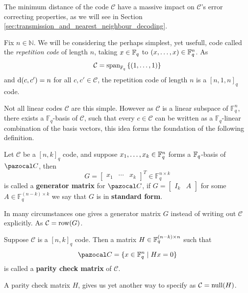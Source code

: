 The minimum distance of the code $\mathcal{C}$ have a massive impact on $\mathcal{C}$'s error correcting properties, as we will see in Section \ref{sec:transmission_and_nearest_neighbour_decoding}.

\begin{example}\label{exmp:repetition_code}
  Fix $n \in \mathbb{N}$.
  We will be considering the perhaps simplest, yet usefull, code called the \textit{repetition code} of length $n$, taking $x \in \mathbb{F}_{q}$ to $(x, \ldots, x) \in \mathbb{F}_{q}^{n}$.
  As
  \begin{equation*}
    \mathcal{C} = \textnormal{span}_{\mathbb{F}_{q}}\left\{(1, \ldots, 1)\right\}
  \end{equation*}
  and $\mathrm{d}(c, c') = n$ for all $c, c' \in \mathcal{C}$, the repetition code of length $n$ is a $[n, 1, n]_{q}$ code.
\end{example}
Not all linear codes $\mathcal{C}$ are this simple. However as $\mathcal{C}$ is a linear subspace of $\mathbb{F}_q^{n}$, there exists a $\mathbb{F}_q$-basis of $\mathcal{C}$, such that every $c \in \mathcal{C}$ can be written as a $\mathbb{F}_q$-linear combination of the basis vectors, this idea forms the foundation of the following definition.

\begin{definition}
  Let $\mathcal{C}$ be a $[n, k]_{q}$ code, and suppose $x_{1}, \ldots, x_{k} \in \mathbb{F}_{q}^{n}$ forms a $\mathbb{F}_{q}$-basis of $\C$, then
  \begin{equation*}
    G = \begin{bmatrix} x_{1} & \cdots & x_{k} \end{bmatrix}^{T} \in \mathbb{F}^{n \times k}_{q}
  \end{equation*}
  is called a \textbf{generator matrix} for $\C$, if $G = \begin{bmatrix} I_k & A \end{bmatrix}$ for some $A \in \mathbb{F}_q^{(n - k) \times k}$ we say that $G$ is in \textbf{standard form}.
\end{definition}
In many circumstances one gives a generator matrix $G$ instead of writing out $\mathcal{C}$ explicitly. As $\mathcal{C} = \textnormal{row}(G)$.
\begin{definition}
  Suppose $\mathcal{C}$ is a $[n, k]_q$ code. Then a matrix $H \in \mathbb{F}_{q}^{(n-k) \times n}$ such that
  \begin{equation*}
    \C = \{x \in \F_{q}^{n} \;\vert\; Hx = 0\}
  \end{equation*}
  is called a \textbf{parity check matrix} of $\mathcal{C}$.
\end{definition}
A parity check matrix $H$, gives us yet another way to specify as $\mathcal{C} = \textnormal{null}(H)$.

